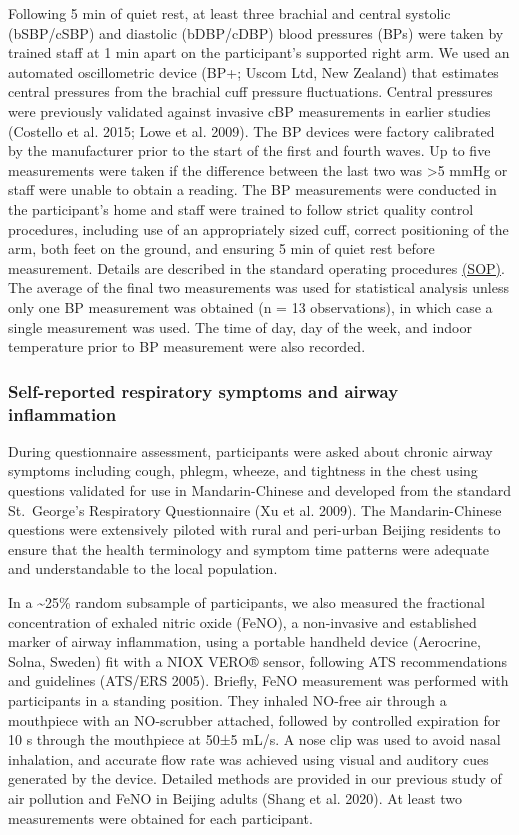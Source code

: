 \documentclass[
  letterpaper,
  DIV=11,
  numbers=noendperiod]{scrartcl}
\begin{document}
Following 5 min of quiet rest, at least three brachial and central
systolic (bSBP/cSBP) and diastolic (bDBP/cDBP) blood pressures (BPs)
were taken by trained staff at 1 min apart on the participant's
supported right arm. We used an automated oscillometric device (BP+;
Uscom Ltd, New Zealand) that estimates central pressures from the
brachial cuff pressure fluctuations. Central pressures were previously
validated against invasive cBP measurements in earlier studies (Costello
et al. 2015; Lowe et al. 2009). The BP devices were factory calibrated
by the manufacturer prior to the start of the first and fourth waves. Up
to five measurements were taken if the difference between the last two
was \textgreater5 mmHg or staff were unable to obtain a reading. The BP
measurements were conducted in the participant's home and staff were
trained to follow strict quality control procedures, including use of an
appropriately sized cuff, correct positioning of the arm, both feet on
the ground, and ensuring 5 min of quiet rest before measurement. Details
are described in the standard operating procedures
\href{https://osf.io/gmka5}{(SOP)}. The average of the final two
measurements was used for statistical analysis unless only one BP
measurement was obtained (n = 13 observations), in which case a single
measurement was used. The time of day, day of the week, and indoor
temperature prior to BP measurement were also recorded.

\subsubsection{Self-reported respiratory symptoms and airway
inflammation}\label{self-reported-respiratory-symptoms-and-airway-inflammation}

During questionnaire assessment, participants were asked about chronic
airway symptoms including cough, phlegm, wheeze, and tightness in the
chest using questions validated for use in Mandarin-Chinese and
developed from the standard St.~George's Respiratory Questionnaire
(Xu et al. 2009). The Mandarin-Chinese questions were
extensively piloted with rural and peri-urban Beijing residents to
ensure that the health terminology and symptom time patterns were
adequate and understandable to the local population.

In a \textasciitilde25\% random subsample of participants, we also
measured the fractional concentration of exhaled nitric oxide (FeNO), a
non-invasive and established marker of airway inflammation, using a
portable handheld device (Aerocrine, Solna, Sweden) fit with a NIOX
VERO® sensor, following ATS recommendations and guidelines (ATS/ERS
2005). Briefly, FeNO measurement was performed with participants in a
standing position. They inhaled NO-free air through a mouthpiece with an
NO-scrubber attached, followed by controlled expiration for 10 s through
the mouthpiece at 50±5 mL/s. A nose clip was used to avoid nasal
inhalation, and accurate flow rate was achieved using visual and
auditory cues generated by the device. Detailed methods are provided in
our previous study of air pollution and FeNO in Beijing adults (Shang et
al. 2020). At least two measurements were obtained for each participant.
\end{document}

